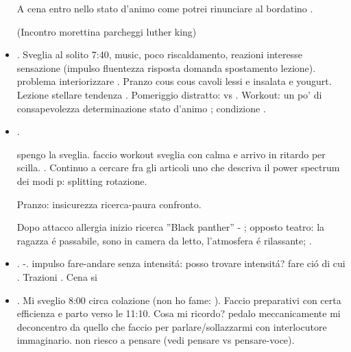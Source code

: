 \begin{itemize}
A cena entro nello stato d'animo  come potrei rinunciare al bordatino .

(Incontro morettina parcheggi luther king)

\item {}. Sveglia al solito 7:40, music, poco riscaldamento, reazioni interesse sensazione  (impulso fluentezza risposta domanda spostamento lezione). problema interiorizzare . Pranzo cous cous cavoli lessi e insalata e yougurt. Lezione stellare tendenza . Pomeriggio distratto:  vs . Workout: un po' di consapevolezza determinazione stato d'animo ; condizione .

\item {}.

spengo la sveglia. faccio workout sveglia con calma e arrivo in ritardo per scilla. . Continuo a cercare fra gli articoli uno che descriva il power spectrum dei modi p: splitting rotazione.

Pranzo: insicurezza ricerca-paura confronto.

Dopo attacco allergia inizio ricerca ''Black panther'' - ;  opposto teatro: la ragazza \'e passabile, sono in camera da letto, l'atmosfera \'e rilassante; .

\item {}. -. impulso fare-andare senza intensit\'a: posso trovare intensit\'a? fare ci\'o di cui 
. Trazioni . Cena si 

\item {}. Mi sveglio 8:00 circa colazione (non ho fame: ). Faccio preparativi con certa efficienza e parto verso le 11:10. Cosa mi ricordo? pedalo meccanicamente mi deconcentro da quello che faccio per parlare/sollazzarmi con interlocutore immaginario.  non riesco a pensare (vedi pensare vs pensare-voce).


\end{itemize}
